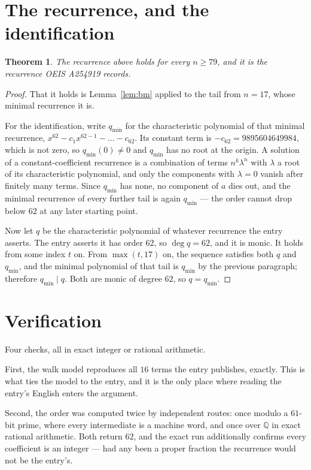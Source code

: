\documentclass[11pt,a4paper]{article}
\theoremstyle{plain}
\newtheorem{theorem}{Theorem}
\theoremstyle{definition}
\begin{document}
\section{The recurrence, and the identification}

\begin{theorem}
The recurrence above holds for every $n\ge79$, and it is the recurrence OEIS A254919 records.
\end{theorem}

\begin{proof}
That it holds is Lemma~\ref{lem:bm} applied to the tail from $n=17$, whose minimal
recurrence it is.

For the identification, write $q_{\min}$ for the characteristic polynomial of that minimal
recurrence, $x^{62}-c_1x^{62-1}-\dots-c_{62}$. Its constant term is
$-c_{62}=9895604649984$, which is not zero, so $q_{\min}(0)\neq0$ and $q_{\min}$ has no
root at the origin. A solution of a constant-coefficient recurrence is a combination of terms
$n^{k}\lambda^{n}$ with $\lambda$ a root of its characteristic polynomial, and only the
components with $\lambda=0$ vanish after finitely many terms. Since $q_{\min}$ has none, no
component of $a$ dies out, and the minimal recurrence of every further tail is again
$q_{\min}$ --- the order cannot drop below $62$ at any later starting point.

Now let $q$ be the characteristic polynomial of whatever recurrence the entry asserts. The
entry asserts it has order $62$, so $\deg q=62$, and it is monic. It holds from some
index $t$ on. From $\max(t,17)$ on, the sequence satisfies both $q$ and $q_{\min}$, and
the minimal polynomial of that tail is $q_{\min}$ by the previous paragraph; therefore
$q_{\min}\mid q$. Both are monic of degree $62$, so $q=q_{\min}$.
\end{proof}

\section{Verification}

Four checks, all in exact integer or rational arithmetic.

First, the walk model reproduces all $16$ terms the entry publishes, exactly. This is
what ties the model to the entry, and it is the only place where reading the entry's English
enters the argument.

Second, the order was computed twice by independent routes: once modulo a $61$-bit prime, where
every intermediate is a machine word, and once over $\mathbb{Q}$ in exact rational arithmetic.
Both return $62$, and the exact run additionally confirms every coefficient is an integer
--- had any been a proper fraction the recurrence would not be the entry's.
\end{document}
